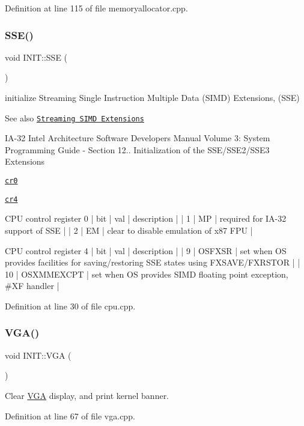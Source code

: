 Definition at line 115 of file memoryallocator.\+cpp.

\mbox{\label{namespace_i_n_i_t_a8928ddbb4ca671dfe1c740da380fa0c4}} 
\subsubsection{\texorpdfstring{S\+S\+E()}{SSE()}}
{\footnotesize\ttfamily void I\+N\+I\+T\+::\+S\+SE (\begin{DoxyParamCaption}{ }\end{DoxyParamCaption})}



initialize Streaming Single Instruction Multiple Data (S\+I\+MD) Extensions, (S\+SE) 

\begin{DoxySeeAlso}{See also}
\href{https://en.wikipedia.org/wiki/Streaming_SIMD_Extensions}{\tt Streaming S\+I\+MD Extensions}

I\+A-\/32 Intel Architecture Software Developer\textquotesingle{}s Manual Volume 3\+: System Programming Guide -\/ Section 12.. Initialization of the S\+S\+E/\+S\+S\+E2/\+S\+S\+E3 Extensions 

\href{https://en.wikipedia.org/wiki/Control_register#CR0}{\tt cr0} 

\href{https://en.wikipedia.org/wiki/Control_register#CR4}{\tt cr4}
\end{DoxySeeAlso}
\begin{DoxyVerb}CPU control register 0
| bit | val | description                           |
|   1 |  MP | required for IA-32 support of SSE     |
|   2 |  EM | clear to disable emulation of x87 FPU |

CPU control register 4
| bit |        val | description                                                                          |
|   9 |     OSFXSR | set when OS provides facilities for saving/restoring SSE states using FXSAVE/FXRSTOR |
|  10 | OSXMMEXCPT | set when OS provides SIMD floating point exception, #XF handler                      |
\end{DoxyVerb}
 

Definition at line 30 of file cpu.\+cpp.

\mbox{\label{namespace_i_n_i_t_abae5789d80f8edd37455f3b167779654}} 
\subsubsection{\texorpdfstring{V\+G\+A()}{VGA()}}
{\footnotesize\ttfamily void I\+N\+I\+T\+::\+V\+GA (\begin{DoxyParamCaption}{ }\end{DoxyParamCaption})}



Clear \hyperlink{namespace_v_g_a}{V\+GA} display, and print kernel banner. 



Definition at line 67 of file vga.\+cpp.

